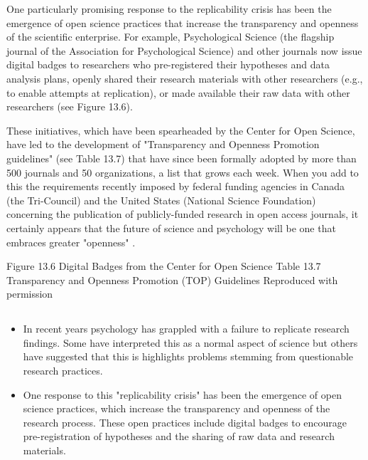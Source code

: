 One particularly promising response to the replicability crisis has been the emergence of open science practices that increase the transparency and openness of the scientific enterprise. For example, Psychological Science (the flagship journal of the Association for Psychological Science) and other journals now issue digital badges to researchers who pre-registered their hypotheses and data analysis plans, openly shared their research materials with other researchers (e.g., to enable attempts at replication), or made available their raw data with other researchers (see Figure 13.6).


These initiatives, which have been spearheaded by the Center for Open Science, have led to the development of "Transparency and Openness Promotion guidelines" (see Table 13.7) that have since been formally adopted by more than 500 journals and 50 organizations, a list that grows each week. When you add to this the requirements recently imposed by federal funding agencies in Canada (the Tri-Council) and the United States (National Science Foundation) concerning the publication of publicly-funded research in open access journals, it certainly appears that the future of science and psychology will be one that embraces greater "openness" \citep{nosek_promoting_2015}.


Figure 13.6 Digital Badges from the Center for Open Science
Table 13.7 Transparency and Openness Promotion (TOP) Guidelines Reproduced with permission


\subsection{}
\begin{fullwidth}
\begin{itemize}
\item In recent years psychology has grappled with a failure to replicate research findings. Some have interpreted this as a normal aspect of science but others have suggested that this is highlights
problems stemming from questionable research practices.

\item One response to this "replicability crisis" has been the emergence of open science practices,
which increase the transparency and openness of the research process. These open practices include digital badges to encourage pre-registration of hypotheses and the sharing of raw data and research materials.


\end{itemize}
\end{fullwidth}

